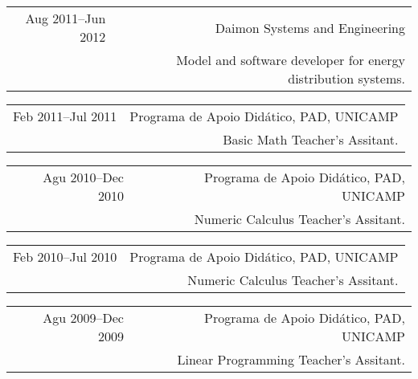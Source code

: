 \documentclass[a4paper,10pt]{article}
\begin{document}
\begin{tabularx}{\textwidth}{D|R}
Aug 2011--Jun 2012   & Daimon Systems and Engineering\\
                    & \footnotesize Model and software developer for energy distribution systems.\\
\end{tabularx}

\begin{tabularx}{\textwidth}{D|R}
Feb 2011--Jul 2011   & Programa de Apoio Didático, PAD, UNICAMP\\
                    & \footnotesize Basic Math Teacher’s Assitant.\\
\end{tabularx}

\begin{tabularx}{\textwidth}{D|R}
Agu 2010--Dec 2010   & Programa de Apoio Didático, PAD, UNICAMP\\
                    & \footnotesize Numeric Calculus Teacher’s Assitant.\\
\end{tabularx}

\begin{tabularx}{\textwidth}{D|R}
Feb 2010--Jul 2010   & Programa de Apoio Didático, PAD, UNICAMP\\
                    & \footnotesize Numeric Calculus Teacher’s Assitant.\\
\end{tabularx}

\begin{tabularx}{\textwidth}{D|R}
Agu 2009--Dec 2009   & Programa de Apoio Didático, PAD, UNICAMP\\
                    & \footnotesize Linear Programming Teacher’s Assitant.\\
\end{tabularx}


\nocite{*}
\printbibliography[title={Publications}]
\end{document}
